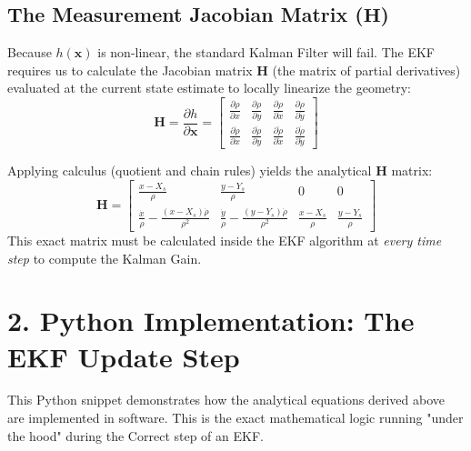 \documentclass[11pt, letterpaper]{article}
\begin{document}
\subsection*{The Measurement Jacobian Matrix ($\mathbf{H}$)}
Because $h(\mathbf{x})$ is non-linear, the standard Kalman Filter will fail. The EKF requires us to calculate the Jacobian matrix $\mathbf{H}$ (the matrix of partial derivatives) evaluated at the current state estimate to locally linearize the geometry:
\begin{equation}
\mathbf{H} = \frac{\partial h}{\partial \mathbf{x}} = 
\begin{bmatrix} 
\frac{\partial \rho}{\partial x} & \frac{\partial \rho}{\partial y} & \frac{\partial \rho}{\partial \dot{x}} & \frac{\partial \rho}{\partial \dot{y}} \\[.5em]
\frac{\partial \dot{\rho}}{\partial x} & \frac{\partial \dot{\rho}}{\partial y} & \frac{\partial \dot{\rho}}{\partial \dot{x}} & \frac{\partial \dot{\rho}}{\partial \dot{y}}
\end{bmatrix}
\end{equation}

Applying calculus (quotient and chain rules) yields the analytical $\mathbf{H}$ matrix:
\begin{equation}
\mathbf{H} = 
\begin{bmatrix} 
\frac{x - X_s}{\rho} & \frac{y - Y_s}{\rho} & 0 & 0 \\[.5em]
\frac{\dot{x}}{\rho} - \frac{(x - X_s)\dot{\rho}}{\rho^2} & \frac{\dot{y}}{\rho} - \frac{(y - Y_s)\dot{\rho}}{\rho^2} & \frac{x - X_s}{\rho} & \frac{y - Y_s}{\rho}
\end{bmatrix}
\end{equation}
This exact matrix must be calculated inside the EKF algorithm at \textit{every time step} to compute the Kalman Gain.

\newpage
\section*{2. Python Implementation: The EKF Update Step}

This Python snippet demonstrates how the analytical equations derived above are implemented in software. This is the exact mathematical logic running "under the hood" during the Correct step of an EKF.
\end{document}
